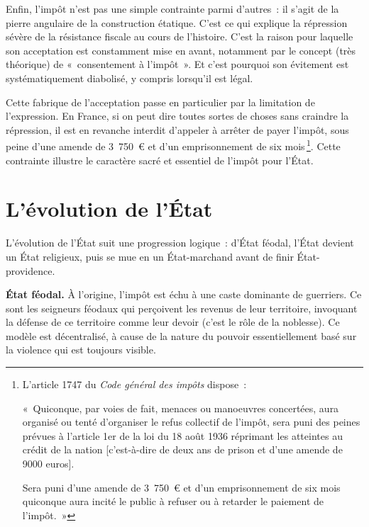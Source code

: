 \documentclass[a4paper,notitlepage]{article}
\renewenvironment{quote}{\small\list{}{\topsep=0.5\baselineskip}\item\relax}{\endlist} %
\newcommand{\sfootnote}{\,\footnote}
\begin{document}

Enfin, l'impôt n'est pas une simple contrainte parmi d'autres~: il s'agit de la pierre angulaire de la construction étatique. C'est ce qui explique la répression sévère de la résistance fiscale au cours de l'histoire. C'est la raison pour laquelle son acceptation est constamment mise en avant, notamment par le concept (très théorique) de «~consentement à l'impôt~». Et c'est pourquoi son évitement est systématiquement diabolisé, y compris lorsqu'il est légal.

Cette fabrique de l'acceptation passe en particulier par la limitation de l'expression. En France, si on peut dire toutes sortes de choses sans craindre la répression, il est en revanche interdit d'appeler à arrêter de payer l'impôt, sous peine d'une amende de 3~750~\euro{} et d'un emprisonnement de six mois\sfootnote{L'article 1747 du \emph{Code général des impôts} dispose~: \begin{quote}
\footnotesize «~Quiconque, par voies de fait, menaces ou manoeuvres concertées, aura organisé ou tenté d'organiser le refus collectif de l'impôt, sera puni des peines prévues à l'article 1er de la loi du 18 août 1936 réprimant les atteintes au crédit de la nation [c'est-à-dire de deux ans de prison et d'une amende de 9000 euros].

Sera puni d'une amende de 3~750~\euro{} et d'un emprisonnement de six mois quiconque aura incité le public à refuser ou à retarder le paiement de l'impôt.~»
\end{quote}}. Cette contrainte illustre le caractère sacré et essentiel de l'impôt pour l'État. %

\section{L'évolution de l'État}


L'évolution de l'État suit une progression logique~: d'État féodal, l'État devient un État religieux, puis se mue en un État-marchand avant de finir État-providence.

\textbf{État féodal.} À l'origine, l'impôt est échu à une caste dominante de guerriers. Ce sont les seigneurs féodaux qui perçoivent les revenus de leur territoire, invoquant la défense de ce territoire comme leur devoir (c'est le rôle de la noblesse). Ce modèle est décentralisé, à cause de la nature du pouvoir essentiellement basé sur la violence qui est toujours visible.
\end{document}
